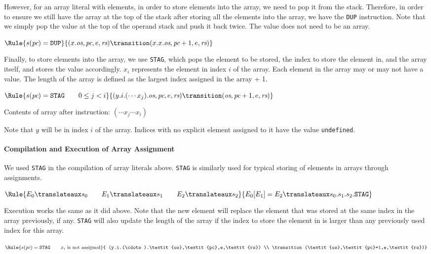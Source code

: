 However, for an array literal with elements, in order to store elements
into the array, we need to pop it from the stack. Therefore, in order
to ensure we still have the array at the top of the stack after storing
all the elements into the array, we have the \texttt{DUP} instruction. 
Note that we simply pop the value at the top of the operand stack
and push it back twice. The value does not need to be an array.

$\Rule{s(\textit{pc}) = \texttt{DUP}}{
(x.\textit{os},\textit{pc},e,\textit{rs}) \transition 
(x.x.\textit{os},\textit{pc}+1,e,\textit{rs})}
$

Finally, to store elements into the array, we use \texttt{STAG}, which pops the
element to be stored, the index to store the element in, and the array
itself, and stores the value accordingly. $x_i$ represents the element
in index $i$ of the array. Each element in the array may or may not have
a value. The length of the array is defined as the largest
index assigned in the array + 1.

$\Rule{s(\textit{pc}) = \texttt{STAG}\qquad 0 \leq j < i}{
(y.i.(\cdots x_j).\textit{os},\textit{pc},e,\textit{rs}) 
\transition (\textit{os},\textit{pc}+1,e,\textit{rs})}
$

Contents of array after instruction: $(\cdots x_j \cdots x_i)$

Note that $y$ will be in index $i$ of the array. Indices with no explicit
element assigned to it have the value \texttt{undefined}.

\paragraph{Compilation and Execution of Array Assignment}
We used \texttt{STAG} in the compilation of array literals
above. \texttt{STAG} is similarly used for typical storing of elements in
arrays through assignments.

$\Rule{
E_0 \translateaux s_0 \qquad E_1 \translateaux s_1 \qquad E_2 \translateaux s_2}
{E_0\lbrack E_1\rbrack = E_2 \translateaux s_0.s_1.s_2.\texttt{STAG}}
$

Execution works the same as it did above. Note that the new element will replace
the element that was stored at the same index in the array previously, if any.
\texttt{STAG} will also update the length of the array if the index to 
store the element in is larger than any previously used index for this array.

$\Rule{s(\textit{pc}) = \texttt{STAG} \qquad x_i \text{ is not assigned}}{
(y.i.(\cdots).\textit{os},\textit{pc},e,\textit{rs}) \\
\transition (\textit{os},\textit{pc}+1,e,\textit{rs})}
$

